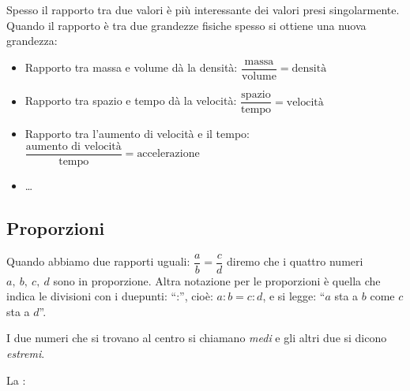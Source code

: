 \begin{esempio}{}{}
~

\\

\end{esempio}

Spesso il rapporto tra due valori è più interessante dei valori presi 
singolarmente. 
Quando il rapporto è tra due grandezze fisiche spesso si 
ottiene una nuova grandezza:
\begin{itemize} [noitemsep]
 \item Rapporto tra massa e volume dà la densità: 
 \(\dfrac{\text{massa}}{\text{volume}}=\text{densità}\)
 \item Rapporto tra spazio e tempo dà la velocità: 
 \(\dfrac{\text{spazio}}{\text{tempo}}=\text{velocità}\)
 \item Rapporto tra l'aumento di velocità e il tempo: 
 \(\dfrac{\text{aumento di velocità}}{\text{tempo}}=\text{accelerazione}\)
 \item \dots
\end{itemize}

\subsection{Proporzioni}

Quando abbiamo due rapporti uguali: \(\dfrac{a}{b} = \dfrac{c}{d}\) diremo 
che i quattro numeri \(a,~b,~c,~d\) sono in proporzione. 
Altra notazione 
per le proporzioni è quella che indica le divisioni con i duepunti: ``:'', 
cioè: \quad \(a:b=c:d\), \quad e si legge: \quad 
``\(a\) sta a \(b\) come \(c\) sta a \(d\)''.

I due numeri che si trovano al centro si chiamano \emph{medi} e gli altri 
due si dicono \emph{estremi}.

La :

